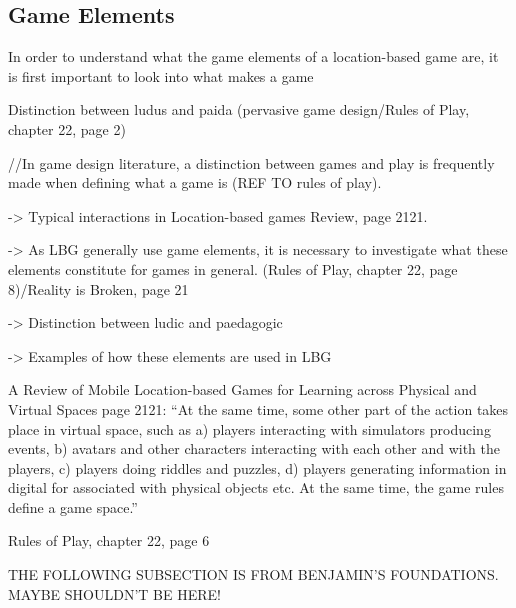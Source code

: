 \subsection{Game Elements}
In order to understand what the game elements of a location-based game are, it is first important to look into what makes a game \cite{RulesofPlay}

Distinction between ludus and paida (pervasive game design/Rules of Play, chapter 22, page 2)

//In game design literature, a distinction between games and play is frequently made when defining what a game is (REF TO rules of play). 

-> Typical interactions in Location-based games Review, page 2121.

-> As LBG generally use game elements, it is necessary to investigate what these elements constitute for games in general. (Rules of Play, chapter 22, page 8)/Reality is Broken, page 21

-> Distinction between ludic and paedagogic

-> Examples of how these elements are used in LBG

A Review of Mobile Location-based Games for Learning across Physical and Virtual Spaces page 2121:
“At the same time, some other part of the action takes place in virtual space, such as a) players interacting with simulators producing events, b) avatars and other characters interacting with each other and with the players, c) players doing riddles and puzzles, d) players generating information in digital for associated with physical objects etc. At the same time, the game rules define a game space.”

Rules of Play, chapter 22, page 6

THE FOLLOWING SUBSECTION IS FROM BENJAMIN'S FOUNDATIONS. MAYBE SHOULDN'T BE HERE!
